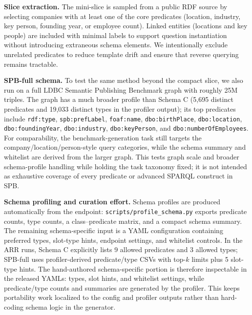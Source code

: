 \documentclass[11pt]{article}
\begin{document}
\textbf{Slice extraction.} The mini-slice is sampled from a public RDF source by selecting companies with at least one of the core predicates (location, industry, key person, founding year, or employee count). Linked entities (locations and key people) are included with minimal labels to support question instantiation without introducing extraneous schema elements. We intentionally exclude unrelated predicates to reduce template drift and ensure that reverse querying remains tractable.

\textbf{SPB-full schema.} To test the same method beyond the compact slice, we also run on a full LDBC Semantic Publishing Benchmark graph with roughly 25M triples. The graph has a much broader profile than Schema C (5{,}695 distinct predicates and 19{,}033 distinct types in the profiler output); its top predicates include \texttt{rdf:type}, \texttt{spb:prefLabel}, \texttt{foaf:name}, \texttt{dbo:birthPlace}, \texttt{dbo:location}, \texttt{dbo:foundingYear}, \texttt{dbo:industry}, \texttt{dbo:keyPerson}, and \texttt{dbo:numberOfEmployees}. For comparability, the benchmark-generation task still targets the company/location/person-style query categories, while the schema summary and whitelist are derived from the larger graph. This tests graph scale and broader schema-profile handling while holding the task taxonomy fixed; it is not intended as exhaustive coverage of every predicate or advanced SPARQL construct in SPB.

\textbf{Schema profiling and curation effort.} Schema profiles are produced automatically from the endpoint: \texttt{scripts/profile\_schema.py} exports predicate counts, type counts, a class--predicate matrix, and a compact schema summary. The remaining schema-specific input is a YAML configuration containing preferred types, slot-type hints, endpoint settings, and whitelist controls. In the ARR runs, Schema C explicitly lists 9 allowed predicates and 3 allowed types; SPB-full uses profiler-derived predicate/type CSVs with top-\(k\) limits plus 5 slot-type hints. The hand-authored schema-specific portion is therefore inspectable in the released YAMLs: types, slot hints, and whitelist settings, while predicate/type counts and summaries are generated by the profiler. This keeps portability work localized to the config and profiler outputs rather than hard-coding schema logic in the generator.
\end{document}

